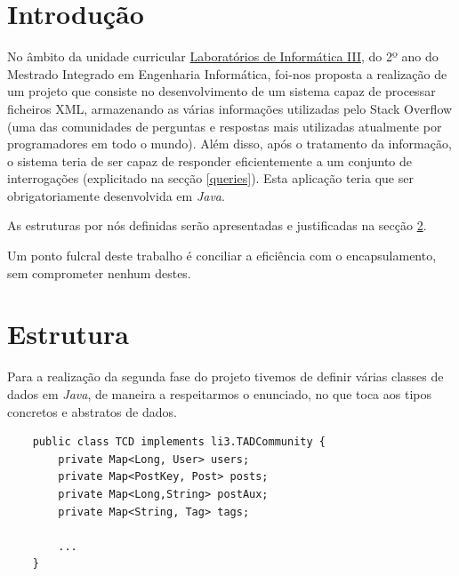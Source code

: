 \documentclass[a4paper, 11pt, oneside]{article}
\begin{document}

\tableofcontents

\newpage


\section{Introdução}

No âmbito da unidade curricular \underline{Laboratórios de Informática III}, do 2º ano do Mestrado Integrado em Engenharia Informática, foi-nos proposta a realização de 
um projeto que consiste no desenvolvimento de um sistema capaz de processar ficheiros XML, armazenando as várias informações utilizadas pelo Stack Overflow (uma das 
comunidades de perguntas e respostas mais utilizadas atualmente por programadores em todo o mundo). Além disso, após o tratamento da informação, o sistema teria de ser capaz 
de responder eficientemente a um conjunto de interrogações (explicitado na secção \ref{queries}). Esta aplicação teria que ser obrigatoriamente desenvolvida em \textit{Java}.

As estruturas por nós definidas serão apresentadas e justificadas na secção \ref{structs}.

Um ponto fulcral deste trabalho é conciliar a eficiência com o encapsulamento, sem comprometer nenhum destes.





\newpage
\section{Estrutura}
\label{structs}

Para a realização da segunda fase do projeto tivemos de definir várias classes de dados em \textit{Java}, de maneira a respeitarmos o enunciado, no que toca aos tipos 
concretos e abstratos de dados.



\begin{lstlisting}
	public class TCD implements li3.TADCommunity {
	    private Map<Long, User> users;
	    private Map<PostKey, Post> posts;
	    private Map<Long,String> postAux;
	    private Map<String, Tag> tags;

	    ...
	}
\end{lstlisting}
\end{document}
